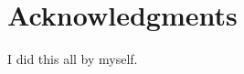 \documentclass[conference]{IEEEtran}
\begin{document}
%



\section*{Acknowledgments}

I did this all by myself.









\end{document}
